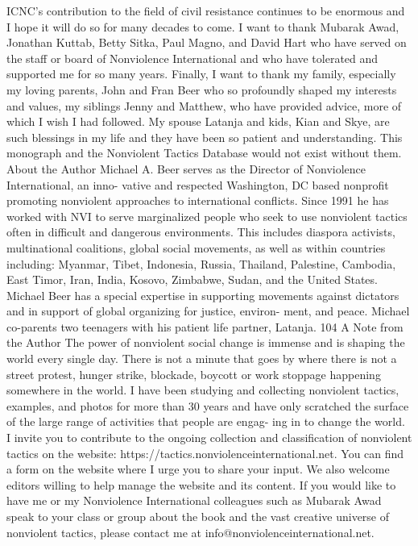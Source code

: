 \documentclass[twoside,a4paper,12pt,fleqn,openany]{extbook}
\begin{document}
ICNC’s contribution to the field of civil resistance continues to be enormous and I hope it will do so for many
decades to come.
I want to thank Mubarak Awad, Jonathan Kuttab, Betty Sitka, Paul Magno, and David Hart who have served on
the staff or board of Nonviolence International and who have tolerated and supported me for so many years.
Finally, I want to thank my family, especially my loving parents, John and Fran Beer who so profoundly shaped
my interests and values, my siblings Jenny and Matthew, who have provided advice, more of which I wish I had
followed. My spouse Latanja and kids, Kian and Skye, are such blessings in my life and they have been so
patient and understanding. This monograph and the Nonviolent Tactics Database would not exist without them.
About the Author
Michael A. Beer serves as the Director of Nonviolence International, an inno-
vative and respected Washington, DC based nonprofit promoting nonviolent
approaches to international conflicts. Since 1991 he has worked with NVI to
serve marginalized people who seek to use nonviolent tactics often in difficult
and dangerous environments. This includes diaspora activists, multinational
coalitions, global social movements, as well as within countries including:
Myanmar, Tibet, Indonesia, Russia, Thailand, Palestine, Cambodia, East Timor,
Iran, India, Kosovo, Zimbabwe, Sudan, and the United States. Michael Beer has a special expertise
in supporting movements against dictators and in support of global organizing for justice, environ-
ment, and peace. Michael co-parents two teenagers with his patient life partner, Latanja.
104
A Note from the Author
The power of nonviolent social change is immense and is shaping the world every single
day. There is not a minute that goes by where there is not a street protest, hunger strike,
blockade, boycott or work stoppage happening somewhere in the world. I have been
studying and collecting nonviolent tactics, examples, and photos for more than 30 years
and have only scratched the surface of the large range of activities that people are engag-
ing in to change the world.
I invite you to contribute to the ongoing collection and classification of nonviolent tactics
on the website: https://tactics.nonviolenceinternational.net. You can find a form on the
website where I urge you to share your input. We also welcome editors willing to help
manage the website and its content.
If you would like to have me or my Nonviolence International colleagues such as Mubarak
Awad speak to your class or group about the book and the vast creative universe of
nonviolent tactics, please contact me at info@nonviolenceinternational.net.
\end{document}
